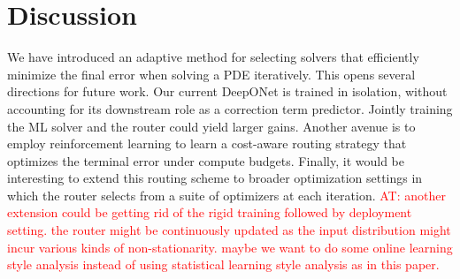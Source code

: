 \documentclass{article} %
\newcommand\ambuj[1]{\textcolor{red}{AT: #1}}
\begin{document}
\section{Discussion}

We have introduced an adaptive method for selecting solvers that efficiently minimize the final error when solving a PDE iteratively. This opens several directions for future work. Our current DeepONet is trained in isolation, without accounting for its downstream role as a correction term predictor. Jointly training the ML solver and the router could yield larger gains. Another avenue is to employ reinforcement learning to learn a cost-aware routing strategy that optimizes the terminal error under compute budgets. Finally, it would be interesting to extend this routing scheme to broader optimization settings in which the router selects from a suite of optimizers at each iteration. \ambuj{another extension could be getting rid of the rigid training followed by deployment setting. the router might be continuously updated as the input distribution might incur various kinds of non-stationarity. maybe we want to do some online learning style analysis instead of using statistical learning style analysis as in this paper.}




\end{document}

